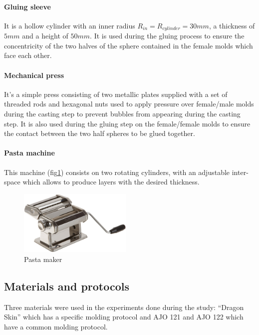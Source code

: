\paragraph{\textbf{Gluing sleeve}}
It is a hollow cylinder with an inner radius $R_{in} = R_{cylinder} = 30 mm$, a thickness of $5 mm$ and a height of $50 mm$. It is used during the gluing process to ensure the concentricity of the two halves of the sphere contained in the female molds which face each other.

\paragraph{\textbf{Mechanical press}}
It's a simple press consisting of two metallic plates supplied with a set of threaded rods and hexagonal nuts used to apply pressure over female/male molds during the casting step to prevent bubbles from appearing during the casting step. It is also used during the gluing step on the female/female molds to ensure the contact between the two half spheres to be glued together.

\paragraph{\textbf{Pasta machine}}
This machine (fig\ref{fig:pasta_maker}) consists on two rotating cylinders, with an adjustable inter-space which allows to produce layers with the desired thickness.
\begin{figure}[h] %
	\centering%
  \includegraphics[width=0.48\textwidth]{figures/Chapter_1/rolling_machine.png}
	\caption{Pasta maker}
	\label{fig:pasta_maker}
\end{figure}

\newpage
\subsection{Materials and protocols}
Three materials were used in the experiments done during the study: "`Dragon Skin"' which has a specific molding protocol and AJO 121 and AJO 122 which have a common molding protocol.

